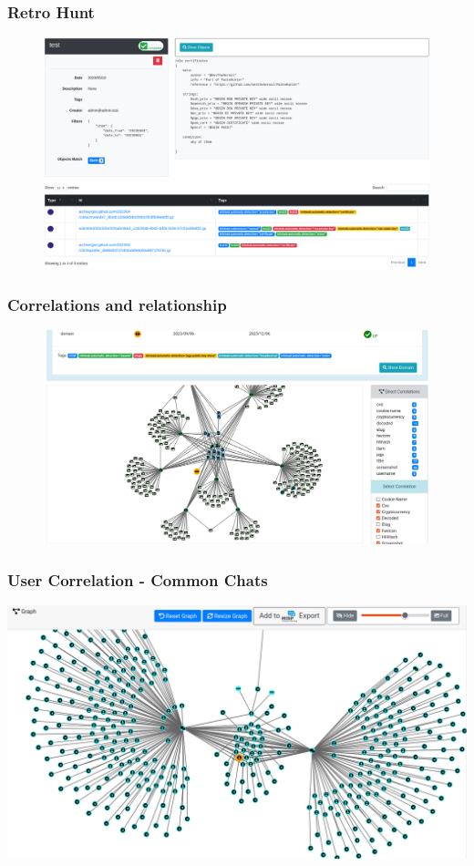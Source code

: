 \documentclass[10pt,aspectratio=169, colorlinks=true, linkcolor=circlBlue]{beamer}
\begin{document}
\begin{frame}
    \frametitle{Retro Hunt}
        \begin{figure}
            \includegraphics[scale=0.22]{screenshot/retro_hunt.png}
        \end{figure}
\end{frame}


\begin{frame}
    \frametitle{Correlations and relationship}
    \begin{figure}
        \includegraphics[scale=0.23, angle=0]{screenshot/ail-correlation.png}
    \end{figure}
\end{frame}

\begin{frame}
    \frametitle{User Correlation - Common Chats}
    \begin{center}
        \includegraphics[scale=0.26]{screenshot/chat_users_correlation.png}
    \end{center}
\end{frame}
\end{document}
